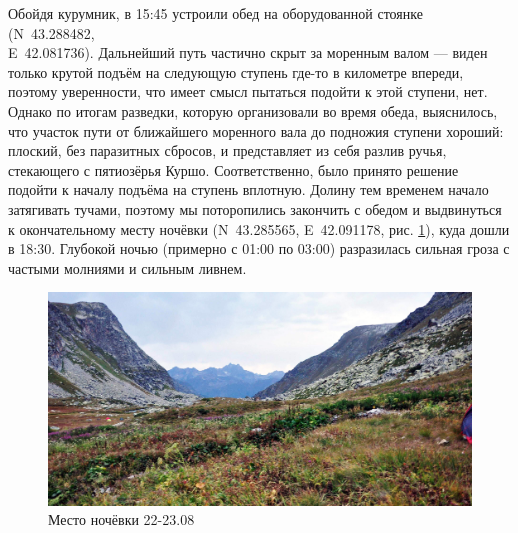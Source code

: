 Обойдя курумник, в 15:45 устроили обед на оборудованной стоянке (N~43.288482\degree,\\E~42.081736\degree). Дальнейший путь частично скрыт за моренным валом --- виден только крутой подъём на следующую ступень где-то в километре впереди, поэтому уверенности, что имеет смысл пытаться подойти к этой ступени, нет. Однако по итогам разведки, которую организовали во время обеда, выяснилось, что участок пути от ближайшего моренного вала до подножия ступени хороший: плоский, без паразитных сбросов, и представляет из себя разлив ручья, стекающего с пятиозёрья Куршо. Соответственно, было принято решение подойти к началу подъёма на ступень вплотную. Долину тем временем начало затягивать тучами, поэтому мы поторопились закончить с обедом и выдвинуться к окончательному месту ночёвки (N~43.285565\degree, E~42.091178\degree, рис. \ref{fig:DSC_0018}), куда дошли в 18:30. Глубокой ночью (примерно с 01:00 по 03:00) разразилась сильная гроза с частыми молниями и сильным ливнем.

\begin{figure}[h!]
	\centering
	\includegraphics[width=0.7\linewidth]{../pics/DSC_0018}
	\caption{Место ночёвки 22-23.08}
	\label{fig:DSC_0018}
\end{figure}

\clearpage